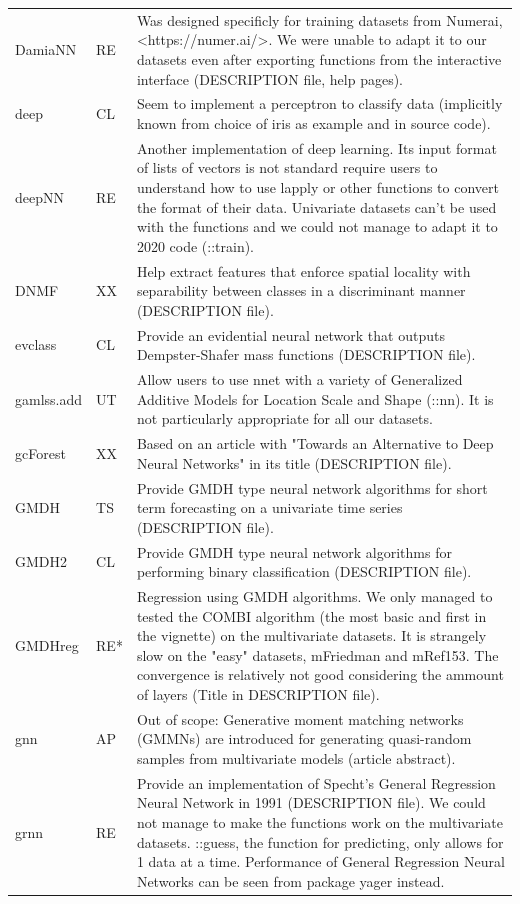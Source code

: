 \begin{Schunk}
\begin{longtable}[t]{ll>{\raggedright\arraybackslash}p{10cm}}
DamiaNN & RE & Was designed specificly for training datasets from Numerai, <https://numer.ai/>. We were unable to adapt it to our datasets even after exporting functions from the interactive interface (DESCRIPTION file, help pages).\\
deep & CL & Seem to implement a perceptron to classify data (implicitly known from choice of iris as example and in source code).\\
deepNN & RE & Another implementation of deep learning. Its input format of lists of vectors is not standard require users to understand how to use lapply or other functions to convert the format of their data. Univariate datasets can't be used with the functions and we could not manage to adapt it to 2020 code (::train).\\
\addlinespace
DNMF & XX & Help extract features that enforce spatial locality with separability between classes in a discriminant manner (DESCRIPTION file).\\
evclass & CL & Provide an evidential neural network that outputs Dempster-Shafer mass functions (DESCRIPTION file).\\
gamlss.add & UT & Allow users to use nnet with a variety of Generalized Additive Models for Location Scale and Shape (::nn). It is not particularly appropriate for all our datasets.\\
gcForest & XX & Based on an article with "Towards an Alternative to Deep Neural Networks" in its title (DESCRIPTION file).\\
GMDH & TS & Provide GMDH type neural network algorithms for short term forecasting on a univariate time series (DESCRIPTION file).\\
\addlinespace
GMDH2 & CL & Provide GMDH type neural network algorithms for performing binary classification (DESCRIPTION file).\\
GMDHreg & RE* & Regression using GMDH algorithms. We only managed to tested the COMBI algorithm (the most basic and first in the vignette) on the multivariate datasets. It is strangely slow on the "easy" datasets, mFriedman and mRef153. The convergence is relatively not good considering the ammount of layers (Title in DESCRIPTION file).\\
gnn & AP & Out of scope: Generative moment matching networks (GMMNs) are introduced for generating quasi-random samples from multivariate models (article abstract).\\
grnn & RE & Provide an implementation of Specht's General Regression Neural Network in 1991 (DESCRIPTION file). We could not manage to make the functions work on the multivariate datasets. ::guess, the function for predicting, only allows for 1 data at a time. Performance of General Regression Neural Networks can be seen from package yager instead.\\

\end{longtable}
\end{Schunk}
